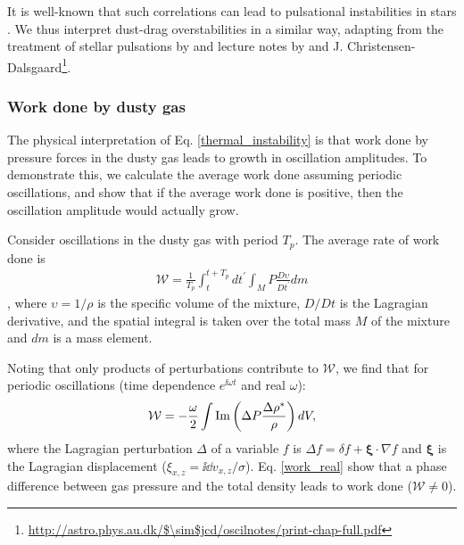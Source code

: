It is well-known that such correlations can lead to pulsational
instabilities in stars \citep{cox67}. We thus interpret  
dust-drag overstabilities in a similar way, 
adapting from the treatment of stellar 
pulsations by \cite{cox67} and lecture notes by \cite{samadi15} and 
J. Christensen-Dalsgaard\footnote{\url{http://astro.phys.au.dk/$\sim$jcd/oscilnotes/print-chap-full.pdf}}.        
 


\subsubsection{Work done by dusty gas} 

The physical interpretation of Eq. \ref{thermal_instability} is that 
work done by pressure forces in the dusty gas leads to growth in
oscillation amplitudes. To demonstrate this, we calculate the average
work done assuming periodic oscillations, and show that if the average
work done is positive, then the 
oscillation amplitude would actually grow. 

Consider oscillations in the dusty gas with period $T_p$. 
The average rate of work done is 
\begin{align}
  \mathcal{W} = \frac{1}{T_p}\int^{t+T_p}_{t}dt^\prime\int_M P
  \frac{D\upsilon}{Dt^\prime} dm \label{work_def} 
\end{align}
\citep[][see their Eq. 4.10 and related discussions]{cox67}, 
where $\upsilon=1/\rho$ is the specific volume of the mixture, $D/Dt$
is the Lagragian derivative, and the 
spatial integral is taken over the total mass $M$ of the mixture and
$dm$ is a mass element. 

Noting that only products of perturbations contribute to
$\mathcal{W}$, we find that for periodic oscillations (time dependence 
$e^{\ii\omega t}$ and real $\omega$): 
\begin{align}
  \mathcal{W} = - \frac{\omega}{2} \int \operatorname{Im}\left(\Delta P
  \frac{\Delta \rho^*}{\rho}\right)dV,\label{work_real}
\end{align}
where %
 the Lagragian perturbation $\Delta$ of a variable $f$ is 
$\Delta f = \delta f + \bm{\xi}\cdot\nabla f$ and $\bm{\xi}$ is the
Lagragian displacement ($    \xi_{x,z} =  \ii \dd v_{x,z}/\sigma$).  
Eq. \ref{work_real} show that a phase difference between gas pressure and
the total density leads to work done
($\mathcal{W}\neq0$).  

